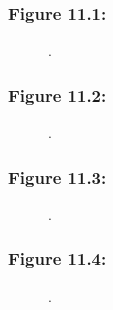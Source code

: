 \documentclass[t]{beamer}\usepackage[]{graphicx}\usepackage[]{color}
\begin{document}
\begin{frame}[label=Figure_11_1]
\frametitle{Figure 11.1: }
\begin{figure}[t]
\begin{minipage}[b]{\textwidth}
\centering

\caption{.}
\end{minipage}
\end{figure}
\end{frame}


\begin{frame}[label=Figure_11_2]
\frametitle{Figure 11.2: }
\begin{figure}[t]
\begin{minipage}[b]{\textwidth}
\centering

\caption{.}
\end{minipage}
\end{figure}
\end{frame}


\begin{frame}[label=Figure_11_3]
\frametitle{Figure 11.3: }
\begin{figure}[t]
\begin{minipage}[b]{\textwidth}
\centering

\caption{.}
\end{minipage}
\end{figure}
\end{frame}


\begin{frame}[label=Figure_11_4]
\frametitle{Figure 11.4: }
\begin{figure}[t]
\begin{minipage}[b]{\textwidth}
\centering

\caption{.}
\end{minipage}
\end{figure}
\end{frame}
\end{document}

